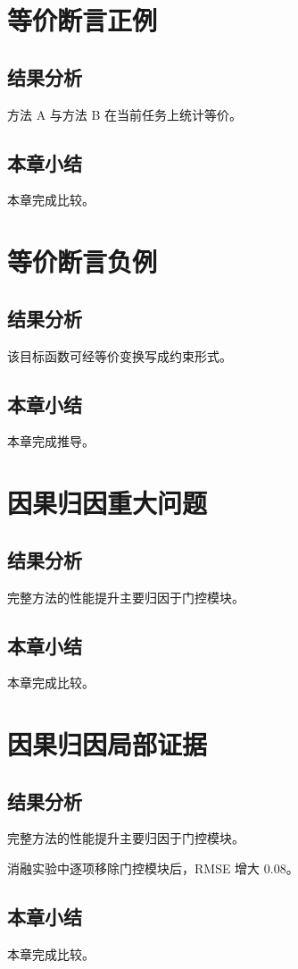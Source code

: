 \chapter{等价断言正例}
\section{结果分析}
方法 A 与方法 B 在当前任务上统计等价。
\section{本章小结}
本章完成比较。

\chapter{等价断言负例}
\section{结果分析}
该目标函数可经等价变换写成约束形式。
\section{本章小结}
本章完成推导。

\chapter{因果归因重大问题}
\section{结果分析}
完整方法的性能提升主要归因于门控模块。
\section{本章小结}
本章完成比较。

\chapter{因果归因局部证据}
\section{结果分析}
完整方法的性能提升主要归因于门控模块。

消融实验中逐项移除门控模块后，RMSE 增大 0.08。
\section{本章小结}
本章完成比较。

